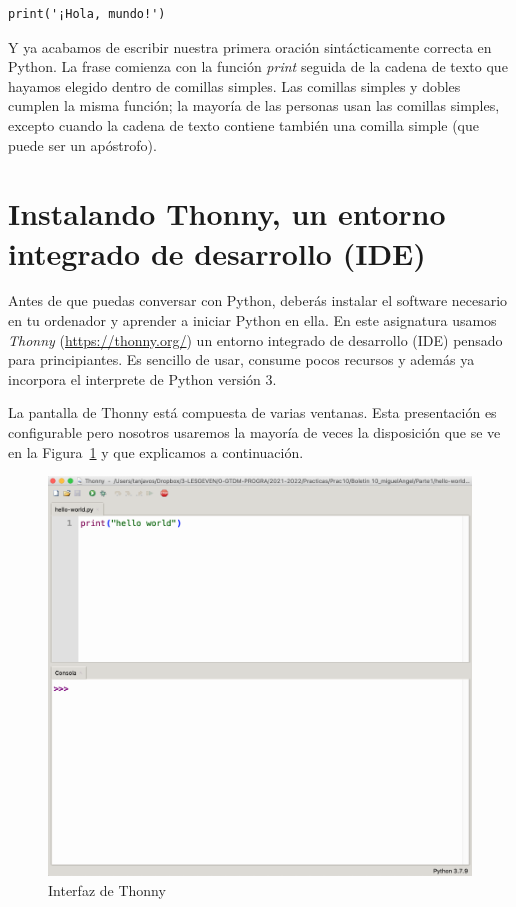 \begin{Verbatim}[frame=single]
    print('¡Hola, mundo!')
\end{Verbatim}

Y ya acabamos de escribir nuestra primera oración sintácticamente
correcta en Python. La frase comienza con la función \emph{print}
seguida de la cadena de texto que hayamos elegido dentro de comillas
simples. Las comillas simples y dobles cumplen la misma función; la
mayoría de las personas usan las comillas simples, excepto cuando la
cadena de texto contiene también una comilla simple (que puede ser un
apóstrofo).

\section{Instalando Thonny, un entorno integrado de desarrollo (IDE)}

Antes de que puedas conversar con Python, deberás instalar el software necesario en tu ordenador y aprender a iniciar Python en ella. En este asignatura usamos {\em Thonny} (\url{https://thonny.org/}) un entorno integrado de desarrollo (IDE) pensado para principiantes. Es sencillo de usar, consume pocos recursos y además ya incorpora el interprete de Python versión 3.


La pantalla de Thonny está compuesta de varias ventanas. Esta presentación es configurable pero nosotros usaremos la mayoría de veces la disposición que se ve en la Figura~\ref{fig:Thonny} y que explicamos a continuación.

\begin{figure}
	\centering
	\includegraphics[width=.85\textwidth]{images/Thonny.png}
	\caption{Interfaz de Thonny}
	\label{fig:Thonny}
\end{figure}

